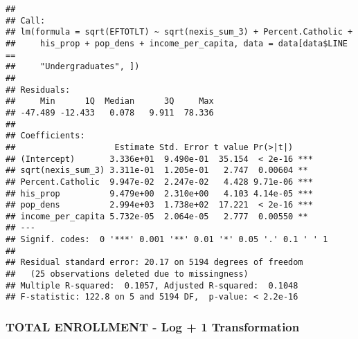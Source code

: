 \documentclass[]{article}
\newenvironment{Shaded}{\begin{snugshade}}{\end{snugshade}}
\newcommand{\KeywordTok}[1]{\textcolor[rgb]{0.13,0.29,0.53}{\textbf{#1}}}
\newcommand{\DataTypeTok}[1]{\textcolor[rgb]{0.13,0.29,0.53}{#1}}
\newcommand{\DecValTok}[1]{\textcolor[rgb]{0.00,0.00,0.81}{#1}}
\newcommand{\StringTok}[1]{\textcolor[rgb]{0.31,0.60,0.02}{#1}}
\newcommand{\OperatorTok}[1]{\textcolor[rgb]{0.81,0.36,0.00}{\textbf{#1}}}
\newcommand{\NormalTok}[1]{#1}
\begin{document}
\begin{verbatim}
## 
## Call:
## lm(formula = sqrt(EFTOTLT) ~ sqrt(nexis_sum_3) + Percent.Catholic + 
##     his_prop + pop_dens + income_per_capita, data = data[data$LINE == 
##     "Undergraduates", ])
## 
## Residuals:
##     Min      1Q  Median      3Q     Max 
## -47.489 -12.433   0.078   9.911  78.336 
## 
## Coefficients:
##                    Estimate Std. Error t value Pr(>|t|)    
## (Intercept)       3.336e+01  9.490e-01  35.154  < 2e-16 ***
## sqrt(nexis_sum_3) 3.311e-01  1.205e-01   2.747  0.00604 ** 
## Percent.Catholic  9.947e-02  2.247e-02   4.428 9.71e-06 ***
## his_prop          9.479e+00  2.310e+00   4.103 4.14e-05 ***
## pop_dens          2.994e+03  1.738e+02  17.221  < 2e-16 ***
## income_per_capita 5.732e-05  2.064e-05   2.777  0.00550 ** 
## ---
## Signif. codes:  0 '***' 0.001 '**' 0.01 '*' 0.05 '.' 0.1 ' ' 1
## 
## Residual standard error: 20.17 on 5194 degrees of freedom
##   (25 observations deleted due to missingness)
## Multiple R-squared:  0.1057, Adjusted R-squared:  0.1048 
## F-statistic: 122.8 on 5 and 5194 DF,  p-value: < 2.2e-16
\end{verbatim}

\subsubsection{TOTAL ENROLLMENT - Log + 1
Transformation}\label{total-enrollment---log-1-transformation}

\begin{Shaded}
\end{Shaded}
\end{document}
